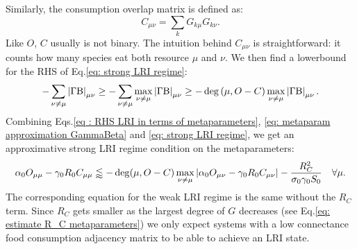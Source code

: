 \documentclass[12pt, titlepage]{report}
\begin{document}
Similarly, the consumption overlap matrix is defined as:
\begin{equation}
C_{\mu\nu}=\sum_k G_{k \mu}G_{k \nu}.
\end{equation}
Like $O$, $C$ usually is not binary. The intuition behind $C_{\mu\nu}$ is straightforward: it counts how many species eat both resource $\mu$ and $\nu$.
We then find a lowerbound for the RHS of Eq.\eqref{eq: strong LRI regime}:
\begin{equation}
-\sum_{\nu\neq\mu}\left|{\Gamma\text{B}}\right|_{\mu\nu} \geq - \sum_{\nu \neq \mu} \max_{\nu \neq \mu} \left|{\Gamma\text{B}}\right|_{\mu\nu} \geq - \deg\left(\mu, O-C \right) \max_{\nu \neq \mu} \left|{\Gamma\text{B}}\right|_{\mu\nu}. \label{eq : RHS LRI in terms of metaparameters}
\end{equation}
Combining Eqs.\eqref{eq : RHS LRI in terms of metaparameters}, \eqref{eq: metaparam approximation GammaBeta} and \eqref{eq: strong LRI regime}, we get an approximative strong LRI regime condition on the metaparameters:
\begin{equation}{
\alpha_0 O_{\mu \mu}-\gamma_0R_0 C_{\mu\mu} \lessapprox - \deg(\mu, O-C) \max_{\nu\neq\mu}\left|{\alpha_0 O_{\mu \nu}-\gamma_0 R_0 C_{\mu\nu}}\right|-\frac{R_C^2}{\sigma_0\gamma_0 S_0} \quad \forall \mu.
}\label{eq: LRI metaparams sufficient}
\end{equation}
The corresponding equation for the weak LRI regime is the same without the $R_C$ term.
Since $R_C$ gets smaller as the largest degree of $G$ decreases (see Eq.\ref{eq: estimate R_C metaparameters}) we only expect systems with a low connectance food consumption adjacency matrix to be able to achieve an LRI state.
\end{document}
